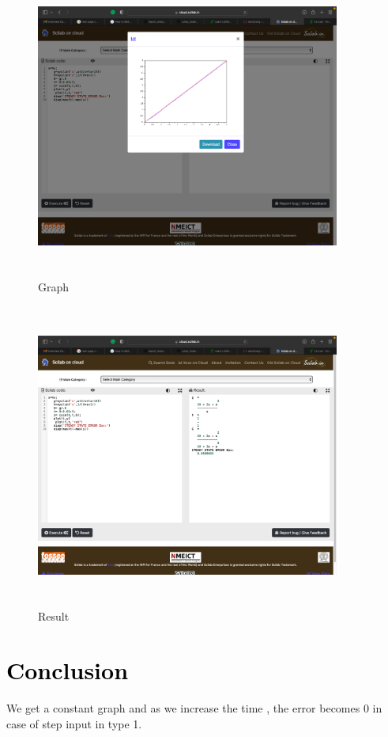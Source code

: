 \documentclass[12pt]{article}
\begin{document}
\begin{figure}[!hth]
        \centering
        \includegraphics[width =10cm, height = 10cm]{images/exp41.png}
        \caption{Graph}
        \label{Result}
        
\end{figure}
        \begin{figure}[!hth]
        \centering
        \includegraphics[width =10cm, height = 10cm]{images/exp42.png}
        \caption{Result}
        \label{Result}
\end{figure}

\section*{\textcolor{black}{Conclusion}}
We get a constant graph and as we increase the time , the error becomes 0 in case of step input in type 1.
  \pagebreak
\end{document}
